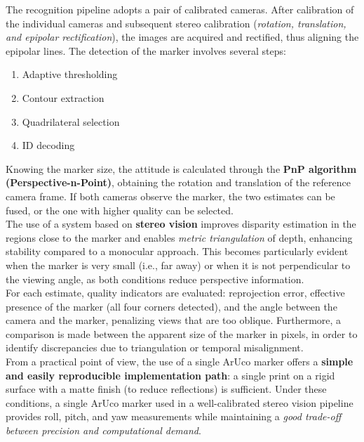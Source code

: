 The recognition pipeline adopts a pair of calibrated cameras. After calibration of the individual cameras and subsequent stereo calibration (\textit{rotation, translation, and epipolar rectification}), the images are acquired and rectified, thus aligning the epipolar lines. The detection of the marker involves several steps:

\begin{enumerate}
    \item Adaptive thresholding
    \item Contour extraction
    \item Quadrilateral selection
    \item ID decoding\\
\end{enumerate}

Knowing the marker size, the attitude is calculated through the \textbf{PnP algorithm (Perspective-n-Point)}, obtaining the rotation and translation of the reference camera frame. If both cameras observe the marker, the two estimates can be fused, or the one with higher quality can be selected.\\

The use of a system based on \textbf{stereo vision} improves disparity estimation in the regions close to the marker and enables \textit{metric triangulation} of depth, enhancing stability compared to a monocular approach. This becomes particularly evident when the marker is very small (i.e., far away) or when it is not perpendicular to the viewing angle, as both conditions reduce perspective information.\\

For each estimate, quality indicators are evaluated: reprojection error, effective presence of the marker (all four corners detected), and the angle between the camera and the marker, penalizing views that are too oblique. Furthermore, a comparison is made between the apparent size of the marker in pixels, in order to identify discrepancies due to triangulation or temporal misalignment. \\

From a practical point of view, the use of a single ArUco marker offers a \textbf{simple and easily reproducible implementation path}: a single print on a rigid surface with a matte finish (to reduce reflections) is sufficient. Under these conditions, a single ArUco marker used in a well-calibrated stereo vision pipeline provides roll, pitch, and yaw measurements while maintaining a \textit{good trade-off between precision and computational demand}.